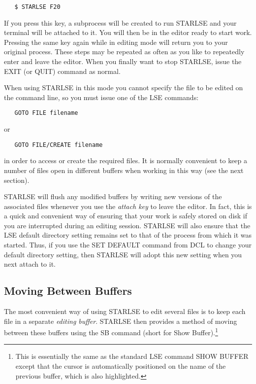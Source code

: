 \begin{verbatim}
   $ STARLSE F20
\end{verbatim}

If you press this key, a subprocess will be created to run STARLSE and your
terminal will be attached to it. You will then be in the editor ready to start
work. Pressing the same key again while in editing mode will return you to your
original process. These steps may be repeated as often as you like to repeatedly
enter and leave the editor. When you finally want to stop STARLSE, issue the
EXIT (or QUIT) command as normal.

When using STARLSE in this mode you cannot specify the  file to be edited on the
command line, so you must issue one of the LSE commands:

\begin{verbatim}
   GOTO FILE filename
\end{verbatim}

or

\begin{verbatim}
   GOTO FILE/CREATE filename
\end{verbatim}

in order to access or create the required files. It is normally convenient to
keep a number of files open in different buffers when working in this way (see
the next section).

STARLSE will flush any modified buffers by writing new versions of the
associated files whenever you use the {\em attach key} to leave the editor. In
fact, this is a quick and convenient way of ensuring that your work is safely
stored on disk if you are interrupted during an editing session. STARLSE will
also ensure that the LSE default directory setting remains set to that of the
process from which it was started. Thus, if you use the SET DEFAULT command from
DCL to change your default directory setting, then STARLSE will adopt this new
setting when you next attach to it.

\subsection{Moving Between Buffers}
\label{sect:buffernavigation}

The most convenient way of using STARLSE to edit several files is to keep each
file in a separate {\em editing buffer}. STARLSE then provides a method of
moving between these buffers using the SB command (short for Show
Buffer).\footnote{This is essentially the same as the standard LSE command SHOW
BUFFER except that the cursor is automatically positioned on the name of the
previous buffer, which is also highlighted.}

